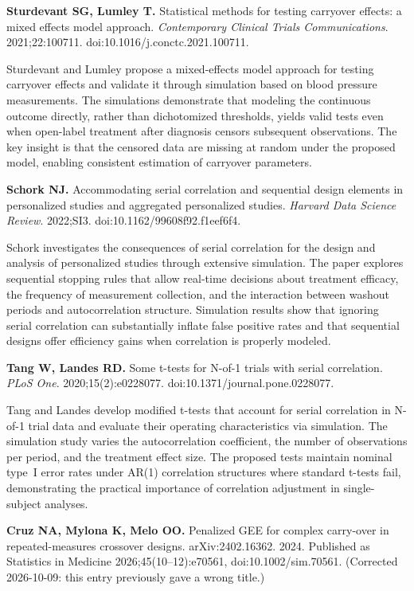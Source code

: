 \documentclass[11pt]{article}
\begin{document}
\medskip
\textbf{Sturdevant SG, Lumley T.} Statistical methods for
testing carryover effects: a mixed effects model approach.
\textit{Contemporary Clinical Trials Communications}.
2021;22:100711. doi:10.1016/j.conctc.2021.100711.

\smallskip\noindent
Sturdevant and Lumley propose a mixed-effects model
approach for testing carryover effects and validate it
through simulation based on blood pressure measurements.
The simulations demonstrate that modeling the continuous
outcome directly, rather than dichotomized thresholds,
yields valid tests even when open-label treatment after
diagnosis censors subsequent observations. The key insight
is that the censored data are missing at random under the
proposed model, enabling consistent estimation of carryover
parameters.

\medskip
\textbf{Schork NJ.} Accommodating serial correlation and
sequential design elements in personalized studies and
aggregated personalized studies. \textit{Harvard Data
Science Review}. 2022;SI3.
doi:10.1162/99608f92.f1eef6f4.

\smallskip\noindent
Schork investigates the consequences of serial correlation
for the design and analysis of personalized studies through
extensive simulation. The paper explores sequential
stopping rules that allow real-time decisions about
treatment efficacy, the frequency of measurement collection,
and the interaction between washout periods and
autocorrelation structure. Simulation results show that
ignoring serial correlation can substantially inflate false
positive rates and that sequential designs offer efficiency
gains when correlation is properly modeled.

\medskip
\textbf{Tang W, Landes RD.} Some t-tests for N-of-1 trials
with serial correlation. \textit{PLoS One}.
2020;15(2):e0228077. doi:10.1371/journal.pone.0228077.

\smallskip\noindent
Tang and Landes develop modified t-tests that account for
serial correlation in N-of-1 trial data and evaluate their
operating characteristics via simulation. The simulation
study varies the autocorrelation coefficient, the number of
observations per period, and the treatment effect size.
The proposed tests maintain nominal type~I error rates
under AR(1) correlation structures where standard t-tests
fail, demonstrating the practical importance of correlation
adjustment in single-subject analyses.

\medskip
\textbf{Cruz NA, Mylona K, Melo OO.} Penalized GEE for complex
carry-over in repeated-measures crossover designs.
arXiv:2402.16362. 2024. Published as Statistics in Medicine
2026;45(10--12):e70561, doi:10.1002/sim.70561. (Corrected
2026-10-09: this entry previously gave a wrong title.)
\end{document}

